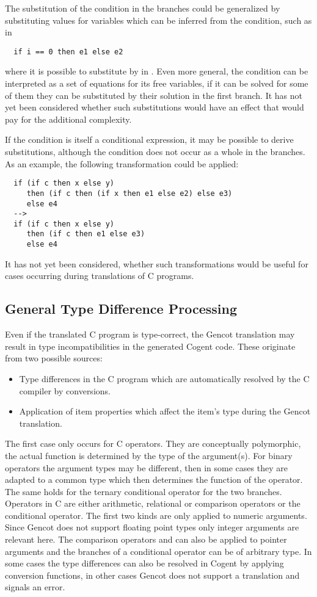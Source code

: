 The substitution of the condition in the branches could be generalized by substituting values for variables which can be
inferred from the condition, such as in
\begin{verbatim}
  if i == 0 then e1 else e2
\end{verbatim}
where it is possible to substitute  by  in . Even more general, the condition can be interpreted as
a set of equations for its free variables, if it can be solved for some of them they can be substituted by their solution
in the first branch. It has not yet been considered whether such substitutions would have an effect that would pay for the 
additional complexity.

If the condition is itself a conditional expression, it may be possible to derive substitutions, although the condition does
not occur as a whole in the branches. As an example, the following transformation could be applied:
\begin{verbatim}
  if (if c then x else y) 
     then (if c then (if x then e1 else e2) else e3) 
     else e4 
  -->
  if (if c then x else y) 
     then (if c then e1 else e3)
     else e4
\end{verbatim}
It has not yet been considered, whether such transformations would be useful for cases occurring during translations of C programs.

\subsection{General Type Difference Processing}
\label{impl-post-types}

Even if the translated C program is type-correct, the Gencot translation may result in type incompatibilities in the generated
Cogent code. These originate from two possible sources:
\begin{itemize}
\item Type differences in the C program which are automatically resolved by the C compiler by conversions.
\item Application of item properties which affect the item's type during the Gencot translation.
\end{itemize}

The first case only occurs for C operators. They are conceptually polymorphic, the actual function is determined by the type
of the argument(s). For binary operators the argument types may be different, then in some cases they are adapted to a common
type which then determines the function of the operator. The same holds for the ternary conditional operator for the two
branches. Operators in C are either arithmetic, relational or comparison operators or the conditional operator. The first
two kinds are only applied to numeric arguments. Since Gencot does not support floating point types only integer arguments
are relevant here. The comparison operators \code{==} and \code{!=} can also be applied to pointer arguments and the branches
of a conditional operator can be of arbitrary type. In some cases the type differences can also be resolved in Cogent by
applying conversion functions, in other cases Gencot does not support a translation and signals an error.

